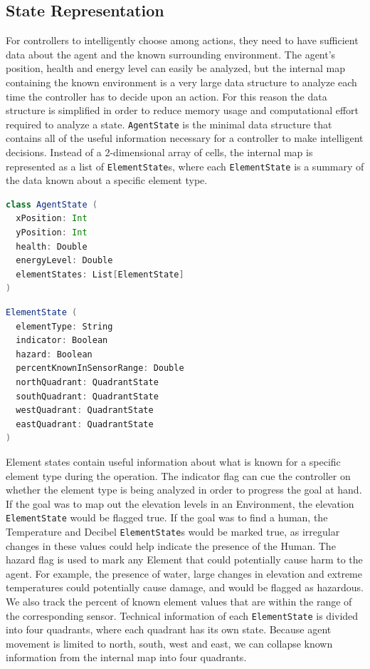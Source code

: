 \subsection{State Representation} \label{subsec:state_representation}
For controllers to intelligently choose among actions, they need to have sufficient data about the agent and the known surrounding environment.
The agent's position, health and energy level can easily be analyzed, but the internal map containing the known environment is a very large data structure to analyze each time the controller has to decide upon an action.
For this reason the data structure is simplified in order to reduce memory usage and computational effort required to analyze a state.
\texttt{AgentState} is the minimal data structure that contains all of the useful information necessary for a controller to make intelligent decisions.
Instead of a 2-dimensional array of cells, the internal map is represented as a list of \texttt{ElementState}s, where each \texttt{ElementState} is a summary of the data known about a specific element type.

\begin{lstlisting}[language=Scala]
class AgentState (
  xPosition: Int
  yPosition: Int
  health: Double
  energyLevel: Double
  elementStates: List[ElementState]
)
\end{lstlisting}

\begin{lstlisting}[language=Scala]
ElementState (
  elementType: String
  indicator: Boolean
  hazard: Boolean
  percentKnownInSensorRange: Double
  northQuadrant: QuadrantState
  southQuadrant: QuadrantState
  westQuadrant: QuadrantState
  eastQuadrant: QuadrantState
)
\end{lstlisting}

Element states contain useful information about what is known for a specific element type during the operation.
The indicator flag can cue the controller on whether the element type is being analyzed in order to progress the goal at hand.
If the goal was to map out the elevation levels in an Environment, the elevation \texttt{ElementState} would be flagged true.
If the goal was to find a human, the Temperature and Decibel \texttt{ElementState}s would be marked true, as irregular changes in these values could help indicate the presence of the Human.
The hazard flag is used to mark any Element that could potentially cause harm to the agent.
For example, the presence of water, large changes in elevation and extreme temperatures could potentially cause damage, and would be flagged as hazardous.
We also track the percent of known element values that are within the range of the corresponding sensor.
Technical information of each \texttt{ElementState} is divided into four quadrants, where each quadrant has its own state.
Because agent movement is limited to north, south, west and east, we can collapse known information from the internal map into four quadrants. 

